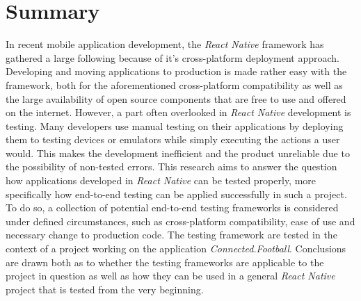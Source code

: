 \section*{Summary}

In recent mobile application development, the \textit{React Native} framework has gathered a large following because of it's cross-platform deployment approach. Developing and moving applications to production is made rather easy with the framework, both for the aforementioned cross-platform compatibility as well as the large availability of open source components that are free to use and offered on the internet.
\newline
However, a part often overlooked in \textit{React Native} development is testing. Many developers use manual testing on their applications by deploying them to testing devices or emulators while simply executing the actions a user would. This makes the development inefficient and the product unreliable due to the possibility of non-tested errors.
\newline
This research aims to answer the question how applications developed in \textit{React Native} can be tested properly, more specifically how end-to-end testing can be applied successfully in such a project. To do so, a collection of potential end-to-end testing frameworks is considered under defined circumstances, such as cross-platform compatibility, ease of use and necessary change to production code.
\newline
The testing framework are tested in the context of a project working on the application \textit{Connected.Football}. Conclusions are drawn both as to whether the testing frameworks are applicable to the project in question as well as how they can be used in a general \textit{React Native} project that is tested from the very beginning.